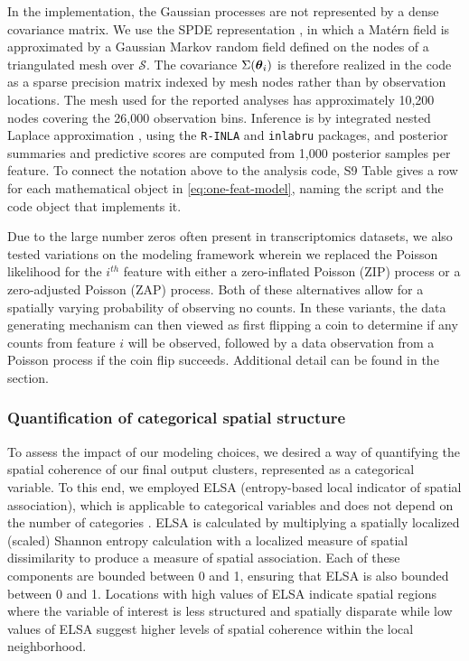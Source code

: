 \documentclass[10pt,letterpaper]{article}
\begin{document}
In the implementation, the Gaussian processes are not represented by a dense covariance matrix. We use the SPDE representation \cite{lindgren2011}, in which a Mat\'ern field is approximated by a Gaussian Markov random field defined on the nodes of a triangulated mesh over $\mathcal{S}$. The covariance $\Sigma(\mbox{\boldmath $\theta$}_i)$ is therefore realized in the code as a sparse precision matrix indexed by mesh nodes rather than by observation locations. The mesh used for the reported analyses has approximately 10{,}200 nodes covering the 26{,}000 observation bins. Inference is by integrated nested Laplace approximation \cite{rue2009}, using the \texttt{R-INLA} and \texttt{inlabru} packages, and posterior summaries and predictive scores are computed from 1{,}000 posterior samples per feature. To connect the notation above to the analysis code, S9 Table gives a row for each mathematical object in \eqref{eq:one-feat-model}, naming the script and the code object that implements it.

Due to the large number zeros often present in transcriptomics datasets, we also tested variations on the modeling framework wherein we replaced the Poisson likelihood for the $i^{th}$ feature with either a zero-inflated Poisson (ZIP) process or a zero-adjusted Poisson (ZAP) process. Both of these alternatives allow for a spatially varying probability of observing no counts. In these variants, the data generating mechanism can then viewed as first flipping a coin to determine if any counts from feature $i$ will be observed, followed by a data observation from a Poisson process if the coin flip succeeds. Additional detail can be found in the  section.

\subsubsection*{Quantification of categorical spatial structure}
\label{sec:elsa}

To assess the impact of our modeling choices, we desired a way of quantifying the spatial coherence of our final output clusters, represented as a categorical variable. To this end, we employed ELSA (entropy-based local indicator of spatial association), which is applicable to categorical variables and does not depend on the number of categories \cite{naimi2019elsa}. ELSA is calculated by multiplying a spatially localized (scaled) Shannon entropy calculation with a localized measure of spatial dissimilarity to produce a measure of spatial association. Each of these components are bounded between 0 and 1, ensuring that ELSA is also bounded between 0 and 1. Locations with high values of ELSA indicate spatial regions where the variable of interest is less structured and spatially disparate while low values of ELSA suggest higher levels of spatial coherence within the local neighborhood.
\end{document}
